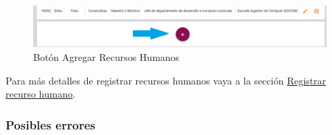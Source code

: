             \begin{figure}[H]
                \centering
                \hypertarget{add}{\includegraphics[width=0.7\linewidth]{images/SP1/BtnAgregar}}
                \caption{Botón Agregar Recursos Humanos}
                \label{add}
            \end{figure}

            Para más detalles de registrar recursos humanos vaya a la sección \hyperlink{registrarRH}{Registrar recurso humano}.

        \subsubsection{Posibles errores}
